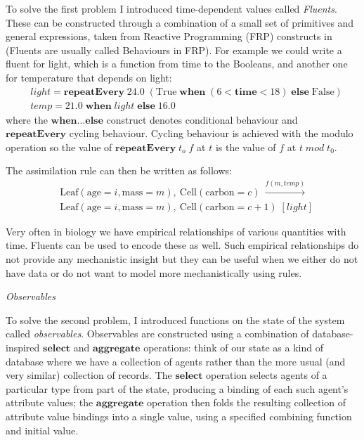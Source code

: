 To solve the first problem I introduced time-dependent values called
\textit{Fluents}. These can be constructed through a combination of a small set
of primitives and general expressions, taken from Reactive Programming (FRP)
constructs in \citep{wan_functional_2000} (Fluents are usually called Behaviours
in FRP). For example we could write a fluent for light, which is a function from
time to the Booleans, and another one for temperature that depends on light:
\begin{align*}
& light = \mathbf{repeatEvery} \; 24.0 \; (\mathrm{True} \; \mathbf{when} \; (6 < \mathbf{time} < 18) \; \mathbf{else} \; \mathrm{False}) \\
& temp = 21.0 \; \mathbf{when} \; light \; \mathbf{else} \; 16.0
\end{align*}
where the $\mathbf{when} \dotso \mathbf{else}$ construct denotes conditional
behaviour and $\mathbf{repeatEvery}$ cycling behaviour. Cycling behaviour is
achieved with the modulo operation so the value of $\mathbf{repeatEvery} \; t_o
\; f$ at $t$ is the value of $f$ at $t \; mod \; t_0$.

The assimilation rule can then be written as follows:
\begin{align*}
& \mathrm{Leaf}(\mathrm{age} \!= \!i, \mathrm{mass} \!= \!m), \: \mathrm{Cell}(\mathrm{carbon} \!= \!c) \: \xrightarrow{f(m, temp)}  \\
&\mathrm{Leaf}(\mathrm{age} \!= \!i, \mathrm{mass} \!= \!m), \:
  \mathrm{Cell}(\mathrm{carbon} \!= \!c+1) \; [light ]
\end{align*}

Very often in biology we have empirical relationships of various quantities with
time. Fluents can be used to encode these as well. Such empirical relationships
do not provide any mechanistic insight but they can be useful when we either do
not have data or do not want to model more mechanistically using rules.

\textit{Observables}

To solve the second problem, I introduced functions on the state of the system
called \textit{observables}. Observables are constructed using a combination of
database-inspired $\mathbf{select}$ and $\mathbf{aggregate}$ operations: %
think of our state as a kind of database where we have a collection of agents
rather than the more usual (and very similar) collection of records. The
$ \mathbf{select}$ operation selects agents of a particular type
from %
part of the state, producing a binding of each such agent's attribute values;
the $\mathbf{aggregate}$ operation then folds the resulting collection of
attribute value bindings into a single value, using a specified combining
function and initial value.

